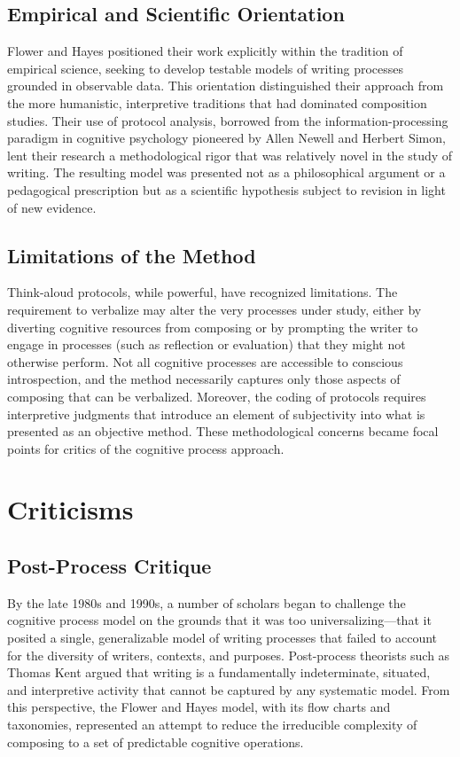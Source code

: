 \documentclass[12pt]{article}
\begin{document}
\subsection{Empirical and Scientific Orientation}

Flower and Hayes positioned their work explicitly within the tradition of empirical science, seeking to develop testable models of writing processes grounded in observable data. This orientation distinguished their approach from the more humanistic, interpretive traditions that had dominated composition studies. Their use of protocol analysis, borrowed from the information-processing paradigm in cognitive psychology pioneered by Allen Newell and Herbert Simon, lent their research a methodological rigor that was relatively novel in the study of writing. The resulting model was presented not as a philosophical argument or a pedagogical prescription but as a scientific hypothesis subject to revision in light of new evidence.

\subsection{Limitations of the Method}

Think-aloud protocols, while powerful, have recognized limitations. The requirement to verbalize may alter the very processes under study, either by diverting cognitive resources from composing or by prompting the writer to engage in processes (such as reflection or evaluation) that they might not otherwise perform. Not all cognitive processes are accessible to conscious introspection, and the method necessarily captures only those aspects of composing that can be verbalized. Moreover, the coding of protocols requires interpretive judgments that introduce an element of subjectivity into what is presented as an objective method. These methodological concerns became focal points for critics of the cognitive process approach.

\section{Criticisms}

\subsection{Post-Process Critique}

By the late 1980s and 1990s, a number of scholars began to challenge the cognitive process model on the grounds that it was too universalizing---that it posited a single, generalizable model of writing processes that failed to account for the diversity of writers, contexts, and purposes. Post-process theorists such as Thomas Kent argued that writing is a fundamentally indeterminate, situated, and interpretive activity that cannot be captured by any systematic model. From this perspective, the Flower and Hayes model, with its flow charts and taxonomies, represented an attempt to reduce the irreducible complexity of composing to a set of predictable cognitive operations.
\end{document}

